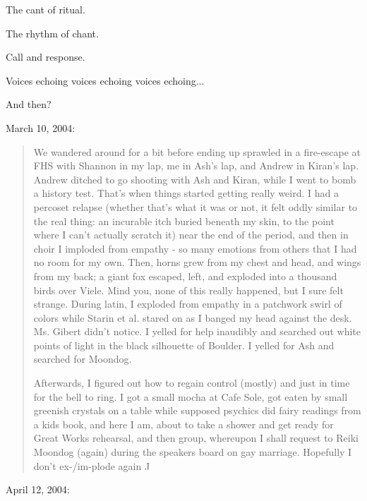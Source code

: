 \noindent The cant of ritual.


\noindent The rhythm of chant.


\noindent Call and response.


\noindent Voices echoing voices echoing voices echoing...


\noindent And then?
\newpage

\noindent March 10, 2004:

\begin{quotation}
\noindent We wandered around for a bit before ending up sprawled in a fire-escape at FHS with Shannon in my lap, me in Ash's lap, and Andrew in Kiran's lap. Andrew ditched to go shooting with Ash and Kiran, while I went to bomb a history test. That's when things started getting really weird. I had a percoset relapse (whether that's what it was or not, it felt oddly similar to the real thing: an incurable itch buried beneath my skin, to the point where I can't actually scratch it) near the end of the period, and then in choir I imploded from empathy - so many emotions from others that I had no room for my own. Then, horns grew from my chest and head, and wings from my back; a giant fox escaped, left, and exploded into a thousand birds over Viele. Mind you, none of this really happened, but I sure felt strange. During latin, I exploded from empathy in a patchwork swirl of colors while Starin et al. stared on as I banged my head against the desk. Ms. Gibert didn't notice. I yelled for help inaudibly and searched out white points of light in the black silhouette of Boulder. I yelled for Ash and searched for Moondog.

Afterwards, I figured out how to regain control (mostly) and just in time for the bell to ring. I got a small mocha at Cafe Sole, got eaten by small greenish crystals on a table while supposed psychics did fairy readings from a kids book, and here I am, about to take a shower and get ready for Great Works rehearsal, and then group, whereupon I shall request to Reiki Moondog (again) during the speakers board on gay marriage. Hopefully I don't ex-/im-plode again ^^
\end{quotation}
\newpage

\noindent April 12, 2004:

